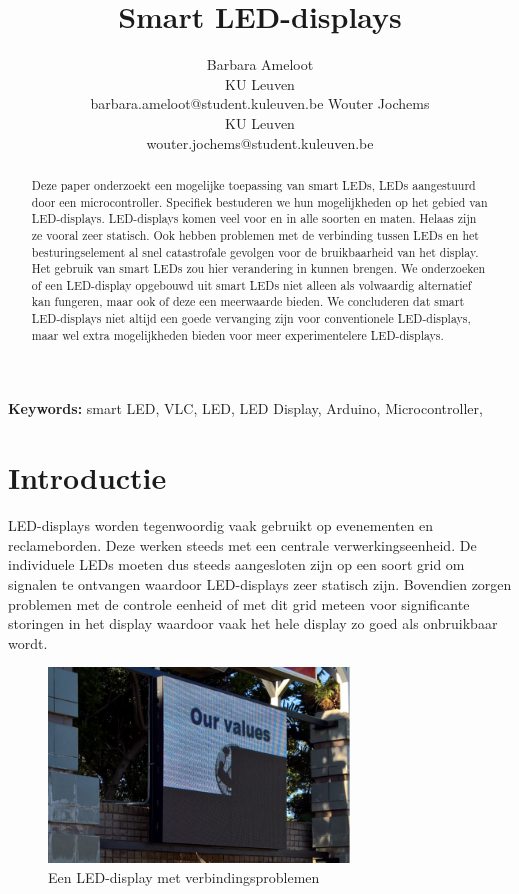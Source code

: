 \documentclass{article}
\title{Smart LED-displays}
\author{Barbara Ameloot\\
KU Leuven\\
barbara.ameloot@student.kuleuven.be
\And 
Wouter Jochems\\
KU Leuven\\
wouter.jochems@student.kuleuven.be}
\begin{document}
\maketitle

\begin{abstract}
Deze paper onderzoekt een mogelijke toepassing van smart LEDs, LEDs aangestuurd door een microcontroller\cite{smartLED}. Specifiek bestuderen we hun mogelijkheden op het gebied van LED-displays. LED-displays komen veel voor en in alle soorten en maten. Helaas zijn ze vooral zeer statisch. Ook hebben problemen met de verbinding tussen LEDs en het besturingselement al snel catastrofale gevolgen voor de bruikbaarheid van het display. Het gebruik van smart LEDs zou hier verandering in kunnen brengen. We onderzoeken of een LED-display opgebouwd uit smart LEDs niet alleen als volwaardig alternatief kan fungeren, maar ook of deze een meerwaarde bieden. We concluderen dat smart LED-displays niet altijd een goede vervanging zijn voor conventionele LED-displays, maar wel extra mogelijkheden bieden voor meer experimentelere LED-displays.
\end{abstract}

{\bf Keywords:} smart LED, VLC, LED, LED Display, Arduino, Microcontroller,


\section{Introductie}

LED-displays worden tegenwoordig vaak gebruikt op evenementen en reclameborden. Deze werken steeds met een centrale verwerkingseenheid. De individuele LEDs moeten dus steeds aangesloten zijn op een soort grid om signalen te ontvangen waardoor LED-displays zeer statisch zijn. Bovendien zorgen problemen met de controle eenheid of met dit grid meteen voor significante storingen in het display\cite{brokenDisplay} waardoor vaak het hele display zo goed als onbruikbaar wordt.
\begin{figure}
\centering
\includegraphics[width=8cm]{broken.png}
\caption{Een LED-display met verbindingsproblemen}
\end{figure}
\end{document}
